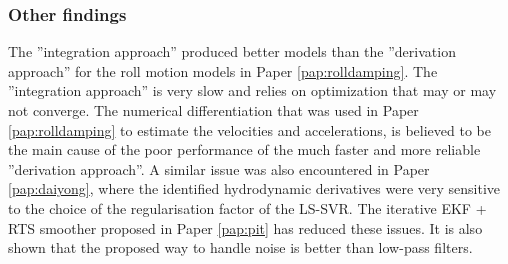 \subsubsection*{Other findings}
The  ''integration approach'' produced better models than the ''derivation approach'' for the roll motion models in Paper \ref{pap:rolldamping}. The ''integration approach'' is very slow and relies on optimization that may or may not converge.
The numerical differentiation that was used in Paper \ref{pap:rolldamping} to estimate the velocities and accelerations, is believed to be the main cause of the poor performance of the much faster and more reliable ''derivation approach''. A similar issue was also encountered in Paper \ref{pap:daiyong}, where the identified hydrodynamic derivatives were very sensitive to the choice of the regularisation factor of the LS-SVR.
The iterative EKF + RTS smoother proposed in Paper \ref{pap:pit} has reduced these issues. It is also shown that the proposed way to handle noise is better than low-pass filters.
